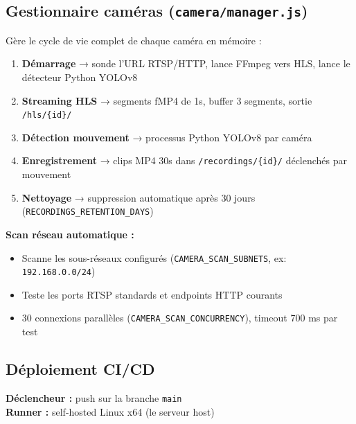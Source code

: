 \documentclass[12pt,a4paper]{article}
\begin{document}
\subsection{Gestionnaire caméras (\texttt{camera/manager.js})}

Gère le cycle de vie complet de chaque caméra en mémoire :

\begin{enumerate}
  \item \textbf{Démarrage} → sonde l'URL RTSP/HTTP, lance FFmpeg vers HLS, lance le détecteur Python YOLOv8
  \item \textbf{Streaming HLS} → segments fMP4 de 1s, buffer 3 segments, sortie \texttt{/hls/\{id\}/}
  \item \textbf{Détection mouvement} → processus Python YOLOv8 par caméra
  \item \textbf{Enregistrement} → clips MP4 30s dans \texttt{/recordings/\{id\}/} déclenchés par mouvement
  \item \textbf{Nettoyage} → suppression automatique après 30 jours (\texttt{RECORDINGS\_RETENTION\_DAYS})
\end{enumerate}

\textbf{Scan réseau automatique :}
\begin{itemize}
  \item Scanne les sous-réseaux configurés (\texttt{CAMERA\_SCAN\_SUBNETS}, ex: \texttt{192.168.0.0/24})
  \item Teste les ports RTSP standards et endpoints HTTP courants
  \item 30 connexions parallèles (\texttt{CAMERA\_SCAN\_CONCURRENCY}), timeout 700 ms par test
\end{itemize}

\subsection{Déploiement CI/CD}

\textbf{Déclencheur :} push sur la branche \texttt{main} \\
\textbf{Runner :} self-hosted Linux x64 (le serveur host)
\end{document}
